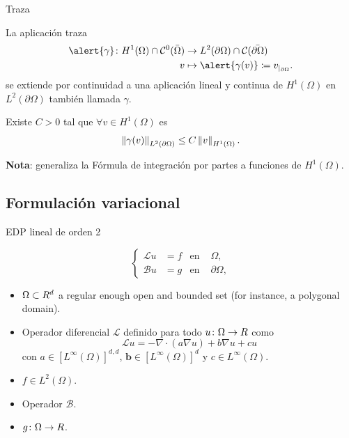 \begin{frame}{Traza}

	\begin{theorem}[Traza]
		
		La aplicación traza
		\begin{align*}
		\alert{\gamma}\colon H^1(\Omega)\cap\mathcal{C}^0(\bar{\Omega})&\to L^2(\partial\Omega)\cap \mathcal{C}(\bar{\partial\Omega})\\
		v	&\mapsto\alert{\gamma(v)}\coloneqq v_{|_{\partial\Omega}}.
		\end{align*}
		se extiende por continuidad a una aplicación lineal y continua de $H^1(\Omega)$ en $L^2(\partial\Omega)$  también llamada $\gamma$.
		
		Existe $C>0$ tal que $\forall v\in H^1(\Omega)$ es $$\left\|\gamma(v)\right\|_{L^2(\partial \Omega)}\leq C\left\|v\right\|_{H^1(\Omega)}.$$
	\end{theorem}
	\textbf{Nota}: generaliza la Fórmula de integración por partes a funciones de $H^1(\Omega)$.
	
\end{frame}

\subsection{Formulación variacional}

\begin{frame}{EDP lineal de orden 2}
\begin{block}{}
\begin{equation*}
\label{ecuacion_general}
\left\{
\begin{aligned}
\mathcal{L}u&=f & \text{en } &\Omega, \\
\mathcal{B}u&=g & \text{en } &\partial\Omega,
\end{aligned}
\right.
\end{equation*}
\end{block}

\begin{itemize}\itemsep1em
\item $\Omega\subset \relax R^d$ a regular enough open and bounded set (for instance, a polygonal domain).
\item Operador diferencial $\mathcal{L}$ definido para todo $u\colon\Omega\to\relax R$ como $$\mathcal{L}u=-\nabla\cdot(a\nabla u)+b\nabla u+c u$$ con $a\in [L^\infty(\Omega)]^{d,d}$, $\mathbf{b}\in [L^\infty(\Omega)]^d$ y $c\in L^\infty(\Omega)$.
\item $f\in L^2(\Omega)$.
\item Operador $\mathcal{B}$.
\item $g\colon\Omega\to\relax R$.
\end{itemize}

\end{frame}

